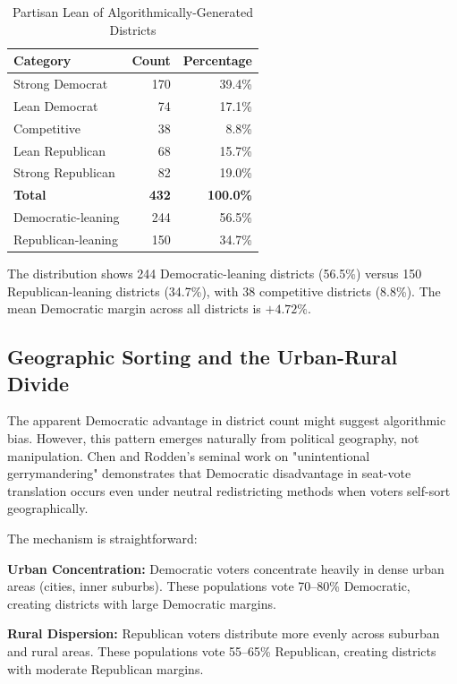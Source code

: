 \begin{table}[h]
\centering
\caption{Partisan Lean of Algorithmically-Generated Districts}
\label{tab:political_stats}
\begin{tabular}{lrr}
\toprule
\textbf{Category} & \textbf{Count} & \textbf{Percentage} \\
\midrule
Strong Democrat & 170 & 39.4\% \\
Lean Democrat & 74 & 17.1\% \\
Competitive & 38 & 8.8\% \\
Lean Republican & 68 & 15.7\% \\
Strong Republican & 82 & 19.0\% \\
\midrule
\textbf{Total} & \textbf{432} & \textbf{100.0\%} \\
\midrule
Democratic-leaning & 244 & 56.5\% \\
Republican-leaning & 150 & 34.7\% \\
\bottomrule
\end{tabular}
\end{table}

The distribution shows 244 Democratic-leaning districts (56.5\%) versus 150 Republican-leaning districts (34.7\%), with 38 competitive districts (8.8\%). The mean Democratic margin across all districts is $+4.72\%$.

\subsection{Geographic Sorting and the Urban-Rural Divide}

The apparent Democratic advantage in district count might suggest algorithmic bias. However, this pattern emerges naturally from political geography, not manipulation. Chen and Rodden's seminal work on "unintentional gerrymandering" \cite{chen2013unintentional} demonstrates that Democratic disadvantage in seat-vote translation occurs even under neutral redistricting methods when voters self-sort geographically.

The mechanism is straightforward:

\textbf{Urban Concentration:} Democratic voters concentrate heavily in dense urban areas (cities, inner suburbs). These populations vote 70--80\% Democratic, creating districts with large Democratic margins.

\textbf{Rural Dispersion:} Republican voters distribute more evenly across suburban and rural areas. These populations vote 55--65\% Republican, creating districts with moderate Republican margins.

